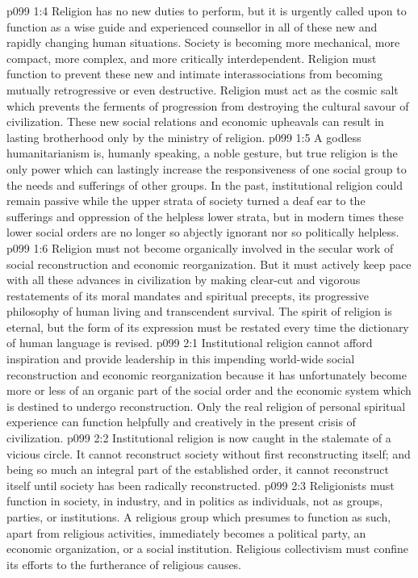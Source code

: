 \vs p099 1:4 Religion has no new duties to perform, but it is urgently called upon to function as a wise guide and experienced counsellor in all of these new and rapidly changing human situations. Society is becoming more mechanical, more compact, more complex, and more critically interdependent. Religion must function to prevent these new and intimate interassociations from becoming mutually retrogressive or even destructive. Religion must act as the cosmic salt which prevents the ferments of progression from destroying the cultural savour of civilization. These new social relations and economic upheavals can result in lasting brotherhood only by the ministry of religion.
\vs p099 1:5 A godless humanitarianism is, humanly speaking, a noble gesture, but true religion is the only power which can lastingly increase the responsiveness of one social group to the needs and sufferings of other groups. In the past, institutional religion could remain passive while the upper strata of society turned a deaf ear to the sufferings and oppression of the helpless lower strata, but in modern times these lower social orders are no longer so abjectly ignorant nor so politically helpless.
\vs p099 1:6 Religion must not become organically involved in the secular work of social reconstruction and economic reorganization. But it must actively keep pace with all these advances in civilization by making clear\hyp{}cut and vigorous restatements of its moral mandates and spiritual precepts, its progressive philosophy of human living and transcendent survival. The spirit of religion is eternal, but the form of its expression must be restated every time the dictionary of human language is revised.
\vs p099 2:1 Institutional religion cannot afford inspiration and provide leadership in this impending world\hyp{}wide social reconstruction and economic reorganization because it has unfortunately become more or less of an organic part of the social order and the economic system which is destined to undergo reconstruction. Only the real religion of personal spiritual experience can function helpfully and creatively in the present crisis of civilization.
\vs p099 2:2 Institutional religion is now caught in the stalemate of a vicious circle. It cannot reconstruct society without first reconstructing itself; and being so much an integral part of the established order, it cannot reconstruct itself until society has been radically reconstructed.
\vs p099 2:3 \pc Religionists must function in society, in industry, and in politics as individuals, not as groups, parties, or institutions. A religious group which presumes to function as such, apart from religious activities, immediately becomes a political party, an economic organization, or a social institution. Religious collectivism must confine its efforts to the furtherance of religious causes.

